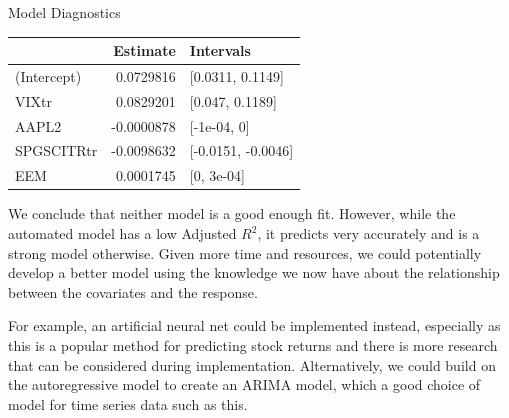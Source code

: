 \documentclass[]{article}
\begin{document}
\begin{section}{Model Diagnostics}
\begin{table}[H]
\centering
\begin{tabular}{l|r|l}
\hline
  & Estimate & Intervals\\
\hline
(Intercept) & 0.0729816 & [0.0311, 0.1149]\\
\hline
VIXtr & 0.0829201 & [0.047, 0.1189]\\
\hline
AAPL2 & -0.0000878 & [-1e-04, 0]\\
\hline
SPGSCITRtr & -0.0098632 & [-0.0151, -0.0046]\\
\hline
EEM & 0.0001745 & [0, 3e-04]\\
\hline
\end{tabular}
\end{table}

We conclude that neither model is a good enough fit. However, while the automated model has a low Adjusted $R^2$, it predicts very accurately and is a strong model otherwise. Given more time and resources, we could potentially develop a better model using the knowledge we now have about the relationship between the covariates and the response. 

For example, an artificial neural net could be implemented instead, especially as this is a popular method for predicting stock returns and there is more research that can be considered during implementation. Alternatively, we could build on the autoregressive model to create an ARIMA model, which a good choice of model for time series data such as this.

\end{section}
\end{document}
